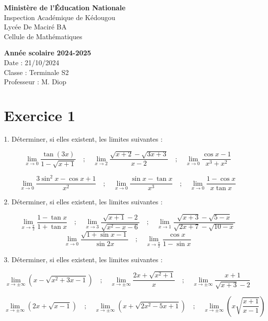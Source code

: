 \documentclass[12pt]{article}
\begin{document}
\noindent
\begin{minipage}[t]{0.48\textwidth}
\raggedright
\textbf{Ministère de l'Éducation Nationale}\\
Inspection Académique de Kédougou\\
Lycée De Maciré BA\\
Cellule de Mathématiques
\end{minipage}
\hfill
\begin{minipage}[t]{0.48\textwidth}
\raggedleft
\textbf{Année scolaire 2024-2025}\\
Date : 21/10/2024\\
Classe : Terminale S2\\
Professeur : M. Diop
\end{minipage}

\vspace{1cm}
\section*{Exercice 1}

1. Déterminer, si elles existent, les limites suivantes :

\[
\lim_{x \to 0} \frac{\tan(3x)}{1 - \sqrt{x + 1}} \quad ; \quad \lim_{x \to 2} \frac{\sqrt{x+2} - \sqrt{3x+3}}{x-2} \quad ; \quad \lim_{x \to 0} \frac{\cos x - 1}{x^3 + x^2}
\]

\[
\lim_{x \to 0} \frac{3 \sin^2 x - \cos x + 1}{x^2} \quad ; \quad \lim_{x \to 0} \frac{\sin x - \tan x}{x^3}\quad ; \quad\lim_{x \to 0} \frac{1 - \cos x}{x \tan x}
\]

2. Déterminer, si elles existent, les limites suivantes :

\[
\lim_{x \to \frac{\pi}{2}} \frac{1 - \tan x}{1 + \tan x}\quad ; \quad \lim_{x \to 3} \frac{\sqrt{x+1} - 2}{\sqrt{x^2 - x - 6}}\quad ; \quad\lim_{x \to 1} \frac{\sqrt{x+3} - \sqrt{5-x}}{\sqrt{2x+7} - \sqrt{10-x}}
\]
\[
\lim_{x \to 0} \frac{\sqrt{1+\sin x -1}}{\sin 2x}\quad ; \quad\lim_{x \to \frac{\pi}{2}} \frac{\cos x}{1-\sin x}
\]

3. Déterminer, si elles existent, les limites suivantes :

\[
\lim_{x \to \pm \infty} \left(x - \sqrt{x^2 + 3x - 1}\right)\quad; \quad \lim_{x \to \pm \infty} \frac{2x + \sqrt{x^2 + 1}}{x}\quad; \quad
\lim_{x \to \pm \infty} \frac{x+1}{\sqrt{x+3}-2}
\]

\[
\lim_{x \to \pm \infty} \left(2x + \sqrt{x - 1}\right)\quad; \quad
\lim_{x \to \pm \infty} \left(x + \sqrt{2x^{2} - 5x + 1 }\right)\quad; \quad
\lim_{x \to \pm \infty} \left(x\sqrt{\frac{x+1}{x-1}}\right)
\]
\end{document}
